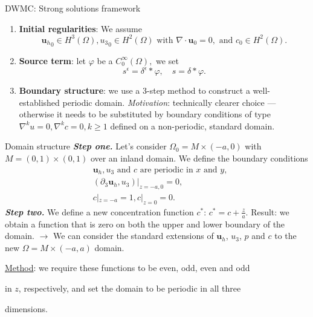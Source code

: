 \documentclass{beamer}
\begin{document}
\begin{frame}{DWMC: Strong solutions framework}
\begin{enumerate}
\item \textbf{Initial regularities}: We assume \begin{equation}\nonumber{\mathbf{u}_h}_0 \in H^3(\Omega), {u_3}_0 \in H^2(\Omega) \text{ with } \nabla \cdot \mathbf{u}_0 = 0, \text{ and } c_0 \in H^2 (\Omega).\end{equation}
\item \textbf{Source term}: let $\varphi$ be a $C^\infty_0 (\Omega),$ we set $$s^\epsilon = \delta^\epsilon \ast \varphi, \quad s = \delta \ast \varphi.$$
\item \textbf{Boundary structure}: we use a 3-step method to construct a well-established periodic domain. \textit{Motivation}: technically clearer choice --- otherwise it needs to be substituted by boundary conditions of type $\nabla^k u = 0, \nabla^k c = 0, k \geq 1$ defined on a non-periodic, standard domain.
\end{enumerate}
\end{frame}

\begin{frame}{Domain structure}
\textit{\textbf{Step one.}} Let's consider $\Omega_0 = M \times (-a, 0)$ with $M = (0,1) \times (0,1)$ over an inland domain. We define the boundary conditions
%
\begin{equation}\nonumber
\begin{split}
& \mathbf{u}_h, u_3 \text{ and } c \text{ are periodic in } x \text{ and } y, \\
& (\partial_3 \mathbf{u}_h, u_3) | _{z = -a, 0} = 0, \\
& c |_{z = -a} = 1, c |_{z = 0} = 0.
\end{split}
\end{equation}
%
\textit{\textbf{Step two.}} We define a new concentration function $c^*$: $c^* = c + \frac{z}{a}.$ Result: we obtain a function that is zero on both the upper and lower boundary of the domain. $\to$ We can consider the standard extensions of $\mathbf{u}_h$, $u_3$, $p$ and $c$ to the new $\Omega = M \times (-a, a)$ domain.

\underline{Method}: we require these functions to be even, odd, even and odd

\hspace{0.2cm} in $z$, respectively, and set the domain to be periodic in all three

\hspace{0.2cm} dimensions.
\end{frame}
\end{document}
